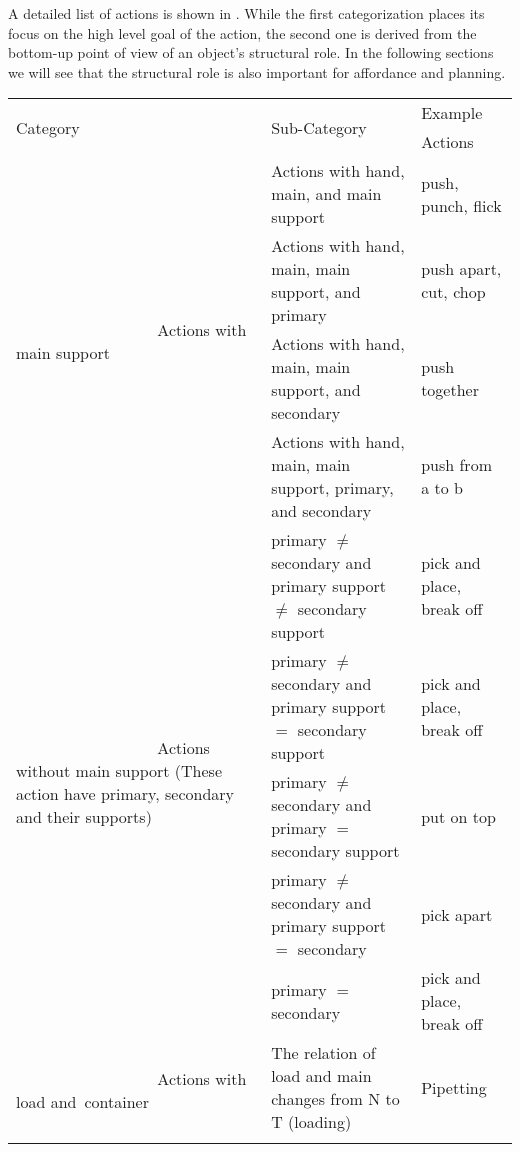 A detailed list of actions is shown in .
While the first categorization places its focus on the high level goal of the action, the second one is derived from the bottom-up point of view of an object's structural role.
In the following sections we will see that the structural role is also important for affordance and planning.

\begin{table}[]
  \begin{tabular}{p{3cm} p{6cm} p{3cm}}
    \toprule
    \multirow{2}{*}{Category}   & \multirow{2}{*}{Sub-Category} & Example\\
                                &                               & Actions\\
    \midrule
    \multirow{4}{3.0cm}{\vspace{1.5cm} \textcolor{white}{~~~~~~~~~~~~~~~~~} Actions with main support} & Actions with hand, main, and main support      & push, punch, flick\\ \cmidrule(l){2-3}
                & Actions with hand, main, main support, and primary                 & push apart, cut, chop\\ \cmidrule(l){2-3}
                & Actions with hand, main, main support, and secondary               & push together\\ \cmidrule(l){2-3}
                & Actions with hand, main, main support, primary, and secondary      & push from a to b\\
    \midrule
    \multirow{5}{3.0cm}{\vspace{1.5cm} \textcolor{white}{~~~~~~~~~~~~~~~~~} Actions without main support (These action have primary, secondary and their supports)}  & primary $\ne$ secondary and primary support $\ne$ secondary support  & pick and place, break off\\ \cmidrule(l){2-3}\
                & primary $\ne$ secondary and primary support $=$ secondary support & pick and place, break off\\ \cmidrule(l){2-3}
                & primary $\ne$ secondary and primary $=$ secondary support         & put on top\\ \cmidrule(l){2-3}
                & primary $\ne$ secondary and primary support $=$ secondary         & pick apart\\ \cmidrule(l){2-3}
                & primary $=$ secondary                                             & pick and place, break off \\
    \midrule
    \multirow{2}{3.0cm}{\vspace{-0.25cm} \textcolor{white}{~~~~~~~~~~~~~~~~~} Actions with load and~container} & The relation of load and main changes from N to T (loading)    & Pipetting\\ \cmidrule(l){2-3}

\end{tabular}
\end{table}
